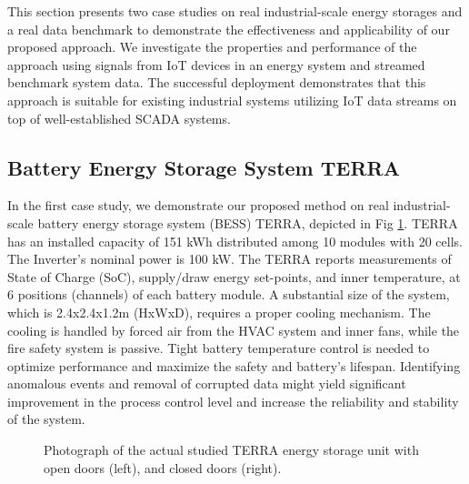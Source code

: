 This section presents two case studies on real industrial-scale energy storages and a real data benchmark to demonstrate the effectiveness and applicability of our proposed approach. We investigate the properties and performance of the approach using signals from IoT devices in an energy system and streamed benchmark system data. The successful deployment demonstrates that this approach is suitable for existing industrial systems utilizing IoT data streams on top of well-established SCADA systems.

\subsection{Battery Energy Storage System TERRA}\label{AA:BESS}
In the first case study, we demonstrate our proposed method on real industrial-scale battery energy storage system (BESS) TERRA, depicted in Fig \ref{fig:terra}. TERRA has an installed capacity of 151 kWh distributed among 10 modules with 20 cells. The Inverter's nominal power is 100 kW. 
The TERRA reports measurements of State of Charge (SoC), supply/draw energy set-points, and inner temperature, at 6 positions (channels) of each battery module. A substantial size of the system, which is 2.4x2.4x1.2m (HxWxD), requires a proper cooling mechanism. The cooling is handled by forced air from the HVAC system and inner fans, while the fire safety system is passive. Tight battery temperature control is needed to optimize performance and maximize the safety and battery's lifespan. Identifying anomalous events and removal of corrupted data might yield significant improvement in the process control level and increase the reliability and stability of the system.

\begin{figure}[htbp]
 \centering
 \caption{Photograph of the actual studied TERRA energy storage unit with open doors (left), and closed doors (right).}
 \label{fig:terra}
\end{figure}

